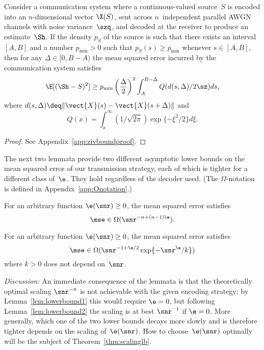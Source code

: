 \begin{lemma}
  \label{lem:zivbound}
  \label{LEM:ZIVBOUND}
  Consider a communication system where a con\-tin\-u\-ous-valued source~$S$ is
  encoded into an $n$-dimensional vector $\X(S)$, sent across $n$~independent
  parallel AWGN channels with noise variance~$\szq$, and decoded at the receiver
  to produce an estimate~$\Sh$.  If the density $p_S$ of the source is such that
  there exists an interval $[A,B]$ and a number $p_{\min} > 0$ such that $p_S(s)
  \ge p_{\min}$ whenever $s \in [A,B]$, then for any $\Delta \in [0,B-A)$ the
  mean squared error incurred by the communication system satisfies
  \begin{equation}
    \label{eq:zivbound}
    \E[(\Sh - S)^2] \ge p_{\min} \left(\frac{\Delta}{2} \right)^2 
    \int_A^{B-\Delta} Q(d(s, \Delta) / 2 \sz) ds,
  \end{equation}
  where $d(s, \Delta) \deq \|\vect{X}(s) - \vect{X}(s+\Delta)\|$ and 
  \[Q(x) = \int_x^{\infty} (1/\sqrt{2\pi}) \exp\{-\xi^2/2\} d\xi.\]
\end{lemma}

\begin{proof}
  See Appendix~\ref{app:zivboundproof}.
\end{proof}

The next two lemmata provide two different asymptotic lower bounds on the
mean squared error of our transmission strategy, each of which is tighter for a
different class of~$\e$. They hold regardless of the decoder used.  (The
$\Omega$-notation is defined in Appendix~\ref{app:Onotation}.)

\begin{lemma}
  \label{lem:lowerbound1}
  For an arbitrary function $\e(\snr) \ge 0$, the mean squared error satisfies
  \begin{equation*}
    \mse \in \Omega(\snr^{-n + (n-1)\e}).
  \end{equation*}
\end{lemma}

\begin{lemma}
  \label{lem:lowerbound2}
  For an arbitrary function $\e(\snr) \ge 0$, the mean squared error satisfies
  \begin{equation*}
    \mse \in \Omega(\snr^{-1+\e/2} \exp\{-\snr^\e/k\})
  \end{equation*}
  where $k > 0$ does not depend on~$\snr$.
\end{lemma}

\emph{Discussion:} An immediate consequence of the lemmata is that the
theoretically optimal scaling $\snr^{-n}$ is not achievable with the given
encoding strategy: by Lemma~\ref{lem:lowerbound1} this would require $\e = 0$,
but following Lemma~\ref{lem:lowerbound2} the scaling is at best $\snr^{-1}$ if
$\e = 0 $.  More generally, which one of the two lower bounds decays more slowly
and is therefore tighter depends on the scaling of~$\e(\snr)$. How to
choose~$\e(\snr)$ optimally will be the subject of Theorem~\ref{thm:scalinglb}.

